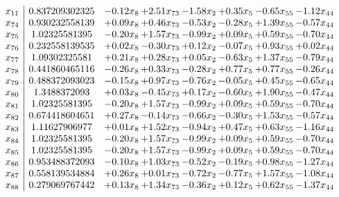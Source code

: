 \documentclass[8pt]{article}
\begin{document}
\[\begin{array}{c| c c@{\hskip 2pt} c@{\hskip 2pt} c@{\hskip 2pt} c@{\hskip 2pt} c@{\hskip 2pt} c@{\hskip 2pt} }
 x_{11}   &  0.837209302325 & -0.12 x_{8} & +  2.51 x_{73} & -1.58 x_{2} & +  0.35 x_{5} & -0.65 x_{55} & -1.12 x_{44}\\
 x_{74}   &  0.930232558139 & +  0.09 x_{8} & +  0.46 x_{73} & -0.53 x_{2} & -0.28 x_{5} & +  1.39 x_{55} & -0.57 x_{44}\\
 x_{75}   &  1.02325581395 & -0.20 x_{8} & +  1.57 x_{73} & -0.99 x_{2} & +  0.09 x_{5} & +  0.59 x_{55} & -0.70 x_{44}\\
 x_{76}   &  0.232558139535 & +  0.02 x_{8} & -0.30 x_{73} & +  0.12 x_{2} & -0.07 x_{5} & +  0.93 x_{55} & +  0.02 x_{44}\\
 x_{77}   &  1.09302325581 & +  0.21 x_{8} & +  0.28 x_{73} & +  0.05 x_{2} & -0.63 x_{5} & +  1.37 x_{55} & -0.79 x_{44}\\
 x_{78}   &  0.441860465116 & -0.26 x_{8} & +  0.33 x_{73} & -0.28 x_{2} & +  0.77 x_{5} & +  0.77 x_{55} & -0.26 x_{44}\\
 x_{79}   &  0.488372093023 & -0.15 x_{8} & +  0.97 x_{73} & -0.76 x_{2} & -0.05 x_{5} & +  0.45 x_{55} & -0.65 x_{44}\\
 x_{80}   &  1.3488372093 & +  0.03 x_{8} & -0.45 x_{73} & +  0.17 x_{2} & -0.60 x_{5} & +  1.90 x_{55} & -0.47 x_{44}\\
 x_{81}   &  1.02325581395 & -0.20 x_{8} & +  1.57 x_{73} & -0.99 x_{2} & +  0.09 x_{5} & +  0.59 x_{55} & -0.70 x_{44}\\
 x_{82}   &  0.674418604651 & +  0.27 x_{8} & -0.14 x_{73} & -0.66 x_{2} & -0.30 x_{5} & +  1.53 x_{55} & -0.57 x_{44}\\
 x_{83}   &  1.11627906977 & +  0.01 x_{8} & +  1.52 x_{73} & -0.94 x_{2} & +  0.47 x_{5} & +  0.63 x_{55} & -1.16 x_{44}\\
 x_{84}   &  1.02325581395 & -0.20 x_{8} & +  1.57 x_{73} & -0.99 x_{2} & +  0.09 x_{5} & +  0.59 x_{55} & -0.70 x_{44}\\
 x_{85}   &  1.02325581395 & -0.20 x_{8} & +  1.57 x_{73} & -0.99 x_{2} & +  0.09 x_{5} & +  0.59 x_{55} & -0.70 x_{44}\\
 x_{86}   &  0.953488372093 & -0.10 x_{8} & +  1.03 x_{73} & -0.52 x_{2} & -0.19 x_{5} & +  0.98 x_{55} & -1.27 x_{44}\\
 x_{87}   &  0.558139534884 & +  0.26 x_{8} & +  0.01 x_{73} & -0.72 x_{2} & -0.77 x_{5} & +  1.57 x_{55} & -1.08 x_{44}\\
 x_{88}   &  0.279069767442 & +  0.13 x_{8} & +  1.34 x_{73} & -0.36 x_{2} & +  0.12 x_{5} & +  0.62 x_{55} & -1.37 x_{44}\\

\end{array}\]
\end{document}
